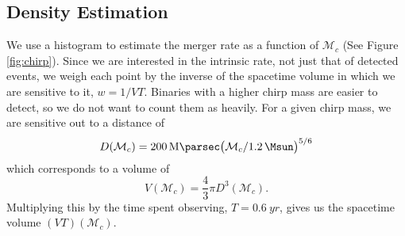 \subsection{Density Estimation}

We use a histogram to estimate the merger rate as a function of $\mathcal{M}_c$ (See Figure \ref{fig:chirp}). Since we are interested in the intrinsic rate, not just that of detected events, we weigh each point by the inverse of the spacetime volume in which we are sensitive to it, $w = 1 / VT$. Binaries with a higher chirp mass are easier to detect, so we do not want to count them as heavily. For a given chirp mass, we are sensitive out to a distance of
%
\begin{equation}
  D(\mathcal{M}_c) =
  \SI{200}{\mega\parsec} \qty( \mathcal{M}_c / \SI{1.2}{\Msun} )^{5/6}
\end{equation}
%
which corresponds to a volume of
%
\begin{equation}
  V(\mathcal{M}_c) = \frac{4}{3} \pi D^3(\mathcal{M}_c).
\end{equation}
%
Multiplying this by the time spent observing, $T = \SI{0.6}{yr}$, gives us the spacetime volume $(VT)(\mathcal{M}_c)$.